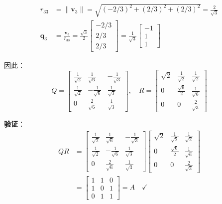 \documentclass[12pt,a4paper]{article}
\begin{document}
\begin{align}
r_{33} &= \|\bm{v}_3\| = \sqrt{(-2/3)^2 + (2/3)^2 + (2/3)^2} = \frac{2}{\sqrt{3}} \\
\bm{q}_3 &= \frac{\bm{v}_3}{r_{33}} = \frac{\sqrt{3}}{2} \begin{bmatrix} -2/3 \\ 2/3 \\ 2/3 \end{bmatrix} = \frac{1}{\sqrt{3}} \begin{bmatrix} -1 \\ 1 \\ 1 \end{bmatrix}
\end{align}

因此：
\begin{equation}
Q = \begin{bmatrix} 
\frac{1}{\sqrt{2}} & \frac{1}{\sqrt{6}} & -\frac{1}{\sqrt{3}} \\
\frac{1}{\sqrt{2}} & -\frac{1}{\sqrt{6}} & \frac{1}{\sqrt{3}} \\
0 & \frac{2}{\sqrt{6}} & \frac{1}{\sqrt{3}}
\end{bmatrix}, \quad
R = \begin{bmatrix} 
\sqrt{2} & \frac{1}{\sqrt{2}} & \frac{1}{\sqrt{2}} \\
0 & \frac{\sqrt{6}}{2} & \frac{1}{\sqrt{6}} \\
0 & 0 & \frac{2}{\sqrt{3}}
\end{bmatrix}
\end{equation}

\textbf{验证}：
\begin{align}
QR &= \begin{bmatrix} 
\frac{1}{\sqrt{2}} & \frac{1}{\sqrt{6}} & -\frac{1}{\sqrt{3}} \\
\frac{1}{\sqrt{2}} & -\frac{1}{\sqrt{6}} & \frac{1}{\sqrt{3}} \\
0 & \frac{2}{\sqrt{6}} & \frac{1}{\sqrt{3}}
\end{bmatrix} \begin{bmatrix} 
\sqrt{2} & \frac{1}{\sqrt{2}} & \frac{1}{\sqrt{2}} \\
0 & \frac{\sqrt{6}}{2} & \frac{1}{\sqrt{6}} \\
0 & 0 & \frac{2}{\sqrt{3}}
\end{bmatrix} \\
&= \begin{bmatrix} 1 & 1 & 0 \\ 1 & 0 & 1 \\ 0 & 1 & 1 \end{bmatrix} = A \quad \checkmark
\end{align}
\end{document}
